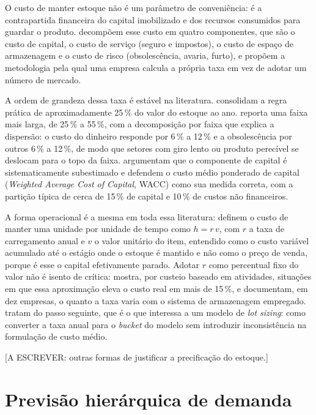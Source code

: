 \documentclass[
    12pt,
    openright,
    oneside,
    a4paper,
    fleqn,
    chapter=TITLE,
    section=TITLE,
    english,
    brazil
]{abntex2}
\begin{document}
O custo de manter estoque não é um parâmetro de conveniência: é a contrapartida financeira do capital imobilizado e dos recursos consumidos para guardar o produto.  decompõem esse custo em quatro componentes, que são o custo de capital, o custo de serviço (seguro e impostos), o custo de espaço de armazenagem e o custo de risco (obsolescência, avaria, furto), e propõem a metodologia pela qual uma empresa calcula a própria taxa em vez de adotar um número de mercado.

A ordem de grandeza dessa taxa é estável na literatura.  consolidam a regra prática de aproximadamente 25\,\% do valor do estoque ao ano.  reporta uma faixa mais larga, de 25\,\% a 55\,\%, com a decomposição por faixa que explica a dispersão: o custo do dinheiro responde por 6\,\% a 12\,\% e a obsolescência por outros 6\,\% a 12\,\%, de modo que setores com giro lento ou produto perecível se deslocam para o topo da faixa.  argumentam que o componente de capital é sistematicamente subestimado e defendem o custo médio ponderado de capital (\textit{Weighted Average Cost of Capital}, WACC) como sua medida correta, com a partição típica de cerca de 15\,\% de capital e 10\,\% de custos não financeiros.

A forma operacional é a mesma em toda essa literatura:  definem o custo de manter uma unidade por unidade de tempo como $h = r\,v$, com $r$ a taxa de carregamento anual e $v$ o valor unitário do item, entendido como o custo variável acumulado até o estágio onde o estoque é mantido e não como o preço de venda, porque é esse o capital efetivamente parado. Adotar $r$ como percentual fixo do valor não é isento de crítica:  mostra, por custeio baseado em atividades, situações em que essa aproximação eleva o custo real em mais de 15\,\%, e  documentam, em dez empresas, o quanto a taxa varia com o sistema de armazenagem empregado.  tratam do passo seguinte, que é o que interessa a um modelo de \textit{lot sizing}: como converter a taxa anual para o \textit{bucket} do modelo sem introduzir inconsistência na formulação de custo médio.

[A ESCREVER: outras formas de justificar a precificação do estoque.]

\section{Previsão hierárquica de demanda}
\label{sec:revisao_previsao}
\end{document}
